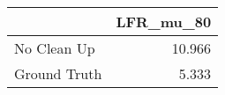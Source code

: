 \begin{tabular}{lr}
\toprule
{} & LFR_mu_80 \\
\midrule
No Clean Up  &    10.966 \\
Ground Truth &     5.333 \\
\bottomrule
\end{tabular}
